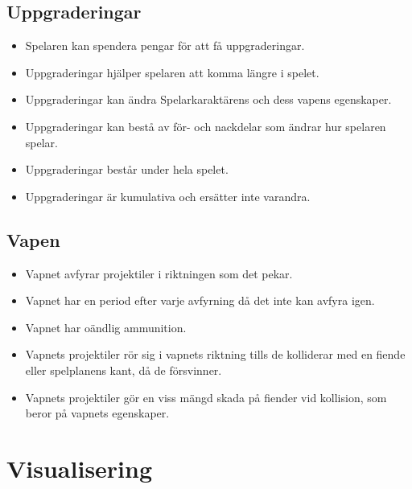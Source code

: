 \documentclass{TDP005mall}
\begin{document}
\subsection{Uppgraderingar}
\begin{itemize}
\item Spelaren kan spendera pengar för att få uppgraderingar.
\item Uppgraderingar hjälper spelaren att komma längre i spelet.
\item Uppgraderingar kan ändra Spelarkaraktärens och dess vapens egenskaper.
\item Uppgraderingar kan bestå av för- och nackdelar som ändrar hur spelaren spelar.
\item Uppgraderingar består under hela spelet.
\item Uppgraderingar är kumulativa och ersätter inte varandra.
\end{itemize}

\subsection{Vapen}
\begin{itemize}
\item Vapnet avfyrar projektiler i riktningen som det pekar.
\item Vapnet har en period efter varje avfyrning då det inte kan avfyra igen.
\item Vapnet har oändlig ammunition.
\item Vapnets projektiler rör sig i vapnets riktning tills de kolliderar med en fiende eller spelplanens kant, då de försvinner.
\item Vapnets projektiler gör en viss mängd skada på fiender vid kollision, som beror på vapnets egenskaper.
\end{itemize}

\section{Visualisering}
\end{document}

